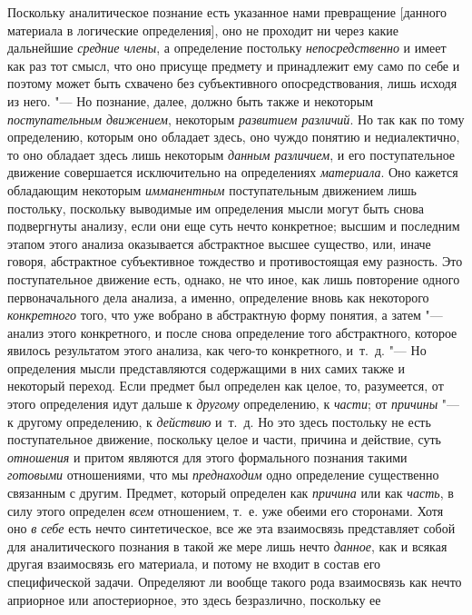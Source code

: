 Поскольку аналитическое познание есть указанное нами
превращение [данного материала в логические определения], оно не проходит
ни через какие дальнейшие {\em средние
члены}, а определение постольку
{\em непосредственно} и
имеет как раз тот смысл, что оно присуще предмету и принадлежит ему само по
себе и поэтому может быть схвачено без субъективного опосредствования, лишь
исходя из него. "--- Но познание, далее, должно быть также и
некоторым {\em поступательным
движением}, некоторым
{\em развитием различий}.
Но так как по тому определению, которым оно обладает здесь,
оно чуждо понятию и недиалектично, то оно обладает здесь лишь некоторым
{\em данным различием}, и
его поступательное движение совершается исключительно на определениях
{\em материала}. Оно
кажется обладающим некоторым
{\em имманентным}
поступательным движением лишь постольку, поскольку выводимые
им определения мысли могут быть снова подвергнуты анализу, если они еще
суть нечто конкретное; высшим и последним этапом этого анализа оказывается
абстрактное высшее существо, или, иначе говоря, абстрактное субъективное
тождество и противостоящая ему разность. Это поступательное движение есть,
однако, не что иное, как лишь повторение одного первоначального дела
анализа, а именно, определение вновь как некоторого
{\em конкретного} того,
что уже вобрано в абстрактную форму понятия, а затем
"--- анализ этого конкретного, и после снова определение того
абстрактного, которое явилось результатом этого анализа, как чего-то
конкретного, и~т.~д. "--- Но определения мысли
представляются содержащими в них самих также и некоторый
переход. Если предмет был определен как целое, то, разумеется, от этого
определения идут дальше к {\em другому}
определению, к
{\em части}; от
{\em причины} "--- к другому
определению, к {\em действию}
и~т.~д. Но это здесь постольку не есть поступательное
движение, поскольку целое и части, причина и действие, суть
{\em отношения} и притом
являются для этого формального познания такими
{\em готовыми}
отношениями, что мы
{\em преднаходим} одно
определение существенно связанным с другим. Предмет, который определен как
{\em причина} или как
{\em часть}, в силу этого
определен {\em всем}
отношением, т.~е. уже обеими его сторонами. Хотя оно
{\em в себе} есть нечто
синтетическое, все же эта взаимосвязь представляет собой для аналитического
познания в такой же мере лишь нечто
{\em данное}, как и
всякая другая взаимосвязь его материала, и потому не входит в состав его
специфической задачи. Определяют ли вообще такого рода взаимосвязь как
нечто априорное или апостериорное, это здесь безразлично, поскольку ее
